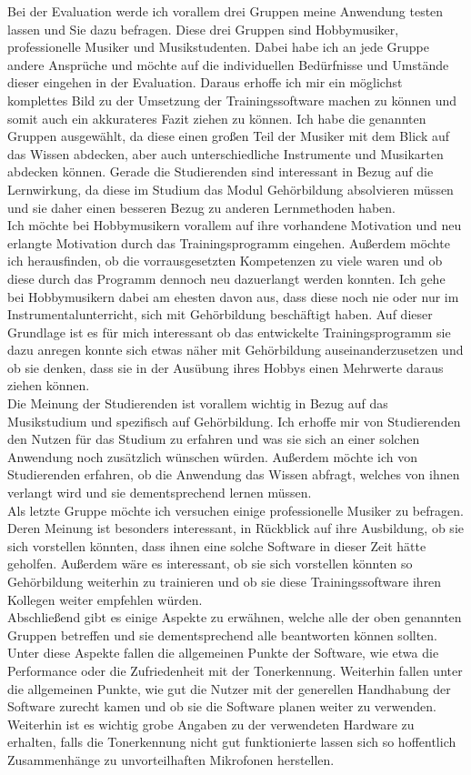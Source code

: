 Bei der Evaluation werde ich vorallem drei Gruppen meine Anwendung testen lassen und Sie dazu befragen. Diese drei Gruppen sind Hobbymusiker, professionelle Musiker und Musikstudenten. Dabei habe ich an jede Gruppe andere Ansprüche
und möchte auf die individuellen Bedürfnisse und Umstände dieser eingehen in der Evaluation. Daraus erhoffe ich mir ein möglichst komplettes Bild zu der Umsetzung der Trainingssoftware machen zu können und somit auch ein akkurateres Fazit ziehen zu können.
Ich habe die genannten Gruppen ausgewählt, da diese einen großen Teil der Musiker mit dem Blick auf das Wissen abdecken, aber auch unterschiedliche Instrumente und Musikarten abdecken können. Gerade die Studierenden sind interessant in Bezug auf die Lernwirkung, 
da diese im Studium das Modul Gehörbildung absolvieren müssen und sie daher einen besseren Bezug zu anderen Lernmethoden haben. \\
Ich möchte bei Hobbymusikern vorallem auf ihre vorhandene Motivation und neu erlangte Motivation durch das Trainingsprogramm eingehen. Außerdem möchte ich herausfinden, ob die vorrausgesetzten Kompetenzen zu viele waren und ob diese durch das Programm dennoch neu dazuerlangt werden konnten.
Ich gehe bei Hobbymusikern dabei am ehesten davon aus, dass diese noch nie oder nur im Instrumentalunterricht, sich mit Gehörbildung beschäftigt haben. Auf dieser Grundlage ist es für mich interessant ob 
das entwickelte Trainingsprogramm sie dazu anregen konnte sich etwas näher mit Gehörbildung auseinanderzusetzen und ob sie denken, dass sie in der Ausübung ihres Hobbys einen Mehrwerte daraus ziehen können. \\
Die Meinung der Studierenden ist vorallem wichtig in Bezug auf das Musikstudium und spezifisch auf Gehörbildung. Ich erhoffe mir von Studierenden den Nutzen für das Studium zu erfahren und was sie sich an einer solchen 
Anwendung noch zusätzlich wünschen würden. Außerdem möchte ich von Studierenden erfahren, ob die Anwendung das Wissen abfragt, welches von ihnen verlangt wird und sie dementsprechend lernen müssen.\\ 
Als letzte Gruppe möchte ich versuchen einige professionelle Musiker zu befragen. Deren Meinung ist besonders interessant, in Rückblick auf ihre Ausbildung, ob sie sich vorstellen könnten, dass ihnen eine solche Software in dieser Zeit
hätte geholfen. Außerdem wäre es interessant, ob sie sich vorstellen könnten so Gehörbildung weiterhin zu trainieren und ob sie diese Trainingssoftware ihren Kollegen weiter empfehlen würden.\\ 
Abschließend gibt es einige Aspekte zu erwähnen, welche alle der oben genannten Gruppen betreffen und sie dementsprechend alle beantworten können sollten. Unter diese Aspekte fallen die allgemeinen Punkte der Software, wie etwa die Performance oder die Zufriedenheit mit 
der Tonerkennung. Weiterhin fallen unter die allgemeinen Punkte, wie gut die Nutzer mit der generellen Handhabung der Software zurecht kamen und ob sie die Software planen weiter zu verwenden.
Weiterhin ist es wichtig grobe Angaben zu der verwendeten Hardware zu erhalten, falls die Tonerkennung nicht gut funktionierte lassen sich so hoffentlich Zusammenhänge zu unvorteilhaften Mikrofonen herstellen.

